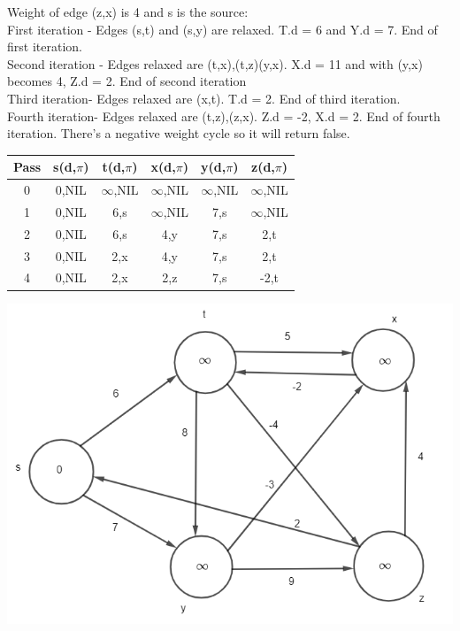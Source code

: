 \documentclass[12pt]{article}
\begin{document}
\begin{enumerate}
Weight of edge (z,x) is 4 and s is the source: \\
First iteration - Edges (s,t) and (s,y) are relaxed. T.d = 6 and Y.d = 7. End of first iteration.\\
Second iteration - Edges relaxed are (t,x),(t,z)(y,x). X.d = 11 and with (y,x) becomes 4, Z.d = 2. End of second iteration\\
Third iteration- Edges relaxed are (x,t). T.d = 2. End of third iteration.\\
Fourth iteration- Edges relaxed are (t,z),(z,x). Z.d = -2, X.d = 2. End of fourth iteration. There's a negative weight cycle so it will return false.\\
\begin{center}
 \begin{tabular}{|c|c c c c c|} 
 \hline
 Pass & s(d,$\pi$) & t(d,$\pi$) & x(d,$\pi$) & y(d,$\pi$) & z(d,$\pi$)\\ [0.5ex] 
 \hline
 0 & 0,NIL &  $\infty$,NIL & $\infty$,NIL & $\infty$,NIL & $\infty$,NIL\\ 
 \hline
 1 & 0,NIL & 6,s & $\infty$,NIL & 7,s & $\infty$,NIL \\
 \hline
 2 & 0,NIL & 6,s & 4,y & 7,s & 2,t \\
 \hline
 3 & 0,NIL & 2,x & 4,y & 7,s & 2,t \\
 \hline
 4 & 0,NIL & 2,x & 2,z & 7,s & -2,t \\
 \hline
\end{tabular}
\end{center}
\includegraphics[scale=.65]{24.1-1 Vertex S/1-2.png}\\

\end{enumerate}
\end{document}
